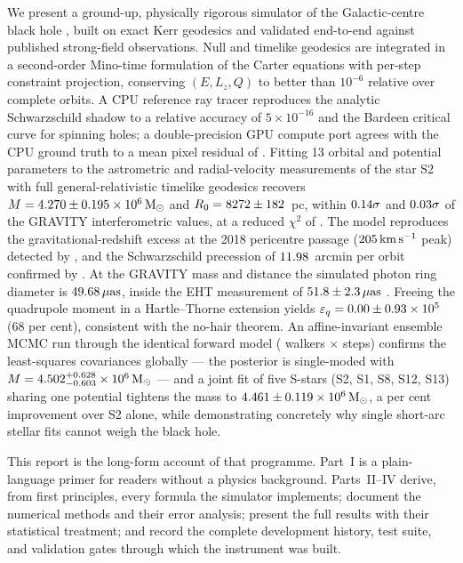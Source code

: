 We present a ground-up, physically rigorous simulator of the Galactic-centre
black hole \sgra{}, built on exact Kerr geodesics and validated end-to-end
against published strong-field observations. Null and timelike geodesics are
integrated in a second-order Mino-time formulation of the Carter equations
with per-step constraint projection, conserving $(E, L_z, Q)$ to better than
$10^{-6}$ relative over complete orbits. A CPU reference ray tracer
reproduces the analytic Schwarzschild shadow to a relative accuracy of
$5\times10^{-16}$ and the Bardeen critical curve for spinning holes; a
double-precision GPU compute port agrees with the CPU ground truth to a mean
pixel residual of \GpuMeanDiff. Fitting 13 orbital and potential parameters
to the \FitNAst{} astrometric and \FitNRv{} radial-velocity measurements of
the star S2 \citep{Gillessen2017} with full general-relativistic timelike
geodesics recovers $M = 4.270 \pm 0.195 \times 10^{6}\,\mathrm{M}_\odot$ and
$R_0 = 8272 \pm 182$~pc, within $0.14\sigma$ and
$0.03\sigma$ of the GRAVITY interferometric values, at a reduced
$\chi^2$ of \FitChiRed. The model reproduces the gravitational-redshift
excess at the 2018 pericentre passage
($205\,\mathrm{km\,s^{-1}}$ peak) detected by
\citet{Gravity2018}, and the Schwarzschild precession of
$11.98$~arcmin per orbit confirmed by \citet{Gravity2020}. At the
GRAVITY mass and distance the simulated photon ring diameter is
$49.68\,\mu\mathrm{as}$, inside the EHT measurement of
$51.8\pm2.3\,\mu\mathrm{as}$ \citep{EHT2022}. Freeing the quadrupole moment in a
Hartle--Thorne extension yields
$\varepsilon_q = 0.00 \pm 0.93 \times 10^{5}$ (68 per cent),
consistent with the no-hair theorem. An affine-invariant ensemble MCMC
run through the identical forward model
(\McmcNWalkers{} walkers $\times$ \McmcNSteps{} steps) confirms the
least-squares covariances globally — the posterior is single-moded
with $M = 4.502^{+0.628}_{-0.603}\times10^6\,\mathrm{M}_\odot$
— and a joint fit of five S-stars (S2, S1, S8, S12, S13) sharing one
potential tightens the mass to
$4.461 \pm 0.119 \times 10^{6}\,\mathrm{M}_\odot$, a
\ClusterMassImprovePct{} per cent improvement over S2 alone, while
demonstrating concretely why single short-arc stellar fits cannot
weigh the black hole.

This report is the long-form account of that programme. Part~I is a
plain-language primer for readers without a physics background. Parts~II--IV
derive, from first principles, every formula the simulator implements;
document the numerical methods and their error analysis; present the full
results with their statistical treatment; and record the complete
development history, test suite, and validation gates through which the
instrument was built.

